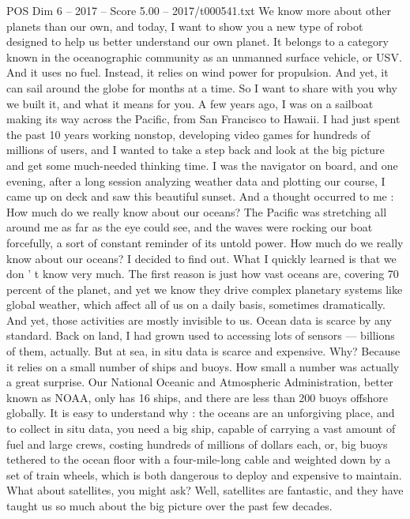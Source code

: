 \begin{textsample}{POS Dim 6 – 2017 – Score 5.00 – 2017/t000541.txt}  \label{ex:f6_pos_058}
We know more about other planets than our own, and today, I want to show you a new type of robot designed to help us better understand our own planet.
It belongs to a category known in the oceanographic community as an unmanned surface vehicle, or USV.
And it uses no fuel.
Instead, it relies on wind power for propulsion.
And yet, it can sail around the globe for months at a time.
So I want to share with you why we built it, and what it means for you.
A few years ago, I was on a sailboat making its way across the Pacific, from San Francisco to Hawaii.
I had just spent the past 10 years working nonstop, developing video games for hundreds of millions of users, and I wanted to take a step back and look at the big picture and get some much-needed thinking time.
I was the navigator on board, and one evening, after a long session analyzing weather data and plotting our course, I came up on deck and saw this beautiful sunset.
And a thought occurred to me : How much do we really know about our oceans?
The Pacific was stretching all around me as far as the eye could see, and the waves were rocking our boat forcefully, a sort of constant reminder of its untold power.
How much do we really know about our oceans?
I decided to find out.
What I quickly learned is that we don ' t know very much.
The first reason is just how vast oceans are, covering 70 percent of the planet, and yet we know they drive complex planetary systems like global weather, which affect all of us on a daily basis, sometimes dramatically.
And yet, those activities are mostly invisible to us.
Ocean data is scarce by any standard.
Back on land, I had grown used to accessing lots of sensors — billions of them, actually.
But at sea, in situ data is scarce and expensive.
Why?
Because it relies on a small number of ships and buoys.
How small a number was actually a great surprise.
Our National Oceanic and Atmospheric Administration, better known as NOAA, only has 16 ships, and there are less than 200 buoys offshore globally.
It is easy to understand why : the oceans are an unforgiving place, and to collect in situ data, you need a big ship, capable of carrying a vast amount of fuel and large crews, costing hundreds of millions of dollars each, or, big buoys tethered to the ocean floor with a four-mile-long cable and weighted down by a set of train wheels, which is both dangerous to deploy and expensive to maintain.
What about satellites, you might ask?
Well, satellites are fantastic, and they have taught us so much about the big picture over the past few decades.

\end{textsample}
